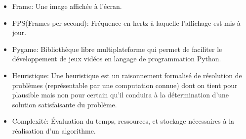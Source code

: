 \begin{itemize}
    \item Frame: Une image affichée à l'écran.\newline 
    
    \item FPS(Frames per second): Fréquence en hertz à laquelle l'affichage est mis à jour.
    \newline
    \item Pygame: Bibliothèque libre multiplateforme qui permet de faciliter le développement de jeux vidéos en langage de programmation Python.
    \newline
    \item Heuristique: Une heuristique est un raisonnement formalisé de résolution de problèmes (représentable par une computation connue) dont on tient pour plausible mais non pour certain qu’il conduira à la détermination d’une solution satisfaisante du problème.
    \newline
    \item Complexité: Évaluation du temps, ressources, et stockage nécessaires à la réalisation d'un algorithme.
    

\end{itemize}{}